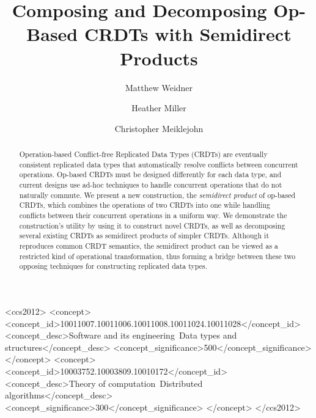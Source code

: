 \documentclass[acmsmall,nonacm]{acmart}
\theoremstyle{plain}
\theoremstyle{definition}
\begin{document}
\title[Composing and Decomposing Op-Based CRDTs with Semidirect Products]{Composing and Decomposing Op-Based CRDTs with Semidirect Products}

\author{Matthew Weidner}

\author{Heather Miller}

\author{Christopher Meiklejohn}

\begin{abstract}
Operation-based Conflict-free Replicated Data Types (CRDTs) are eventually consistent replicated data types that automatically resolve conflicts between concurrent operations.  Op-based CRDTs must be designed differently for each data type, and current designs use ad-hoc techniques to handle concurrent operations that do not naturally commute.  We present a new construction, the \textit{semidirect product} of op-based CRDTs, which combines the operations of two CRDTs into one while handling conflicts between their concurrent operations in a uniform way.  We demonstrate the construction's utility by using it to construct novel CRDTs, as well as decomposing several existing CRDTs as semidirect products of simpler CRDTs.  Although it reproduces common CRDT semantics, the semidirect product can be viewed as a restricted kind of operational transformation, thus forming a bridge between these two opposing techniques for constructing replicated data types.
\end{abstract}

\begin{CCSXML}
<ccs2012>
   <concept>
       <concept_id>10011007.10011006.10011008.10011024.10011028</concept_id>
       <concept_desc>Software and its engineering~Data types and structures</concept_desc>
       <concept_significance>500</concept_significance>
       </concept>
   <concept>
       <concept_id>10003752.10003809.10010172</concept_id>
       <concept_desc>Theory of computation~Distributed algorithms</concept_desc>
       <concept_significance>300</concept_significance>
       </concept>
 </ccs2012>
\end{CCSXML}
\end{document}
